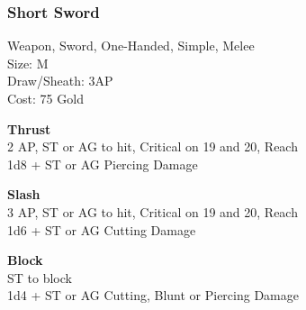 \subsubsection{Short Sword}\label{weapon:shortSword}
Weapon, Sword, One-Handed, Simple, Melee\\
Size: M\\
Draw/Sheath: 3AP\\
Cost: 75 Gold

\textbf{Thrust}\\
2 AP, ST or AG to hit, Critical on 19 and 20,  Reach\\
1d8 + \texttimes ST or AG Piercing Damage

\textbf{Slash}\\
3 AP, ST or AG to hit, Critical on 19 and 20,  Reach\\
1d6 + \texttimes ST or AG Cutting Damage

\textbf{Block}\\
ST to block\\
1d4 + \texttimes ST or AG Cutting, Blunt or Piercing Damage

